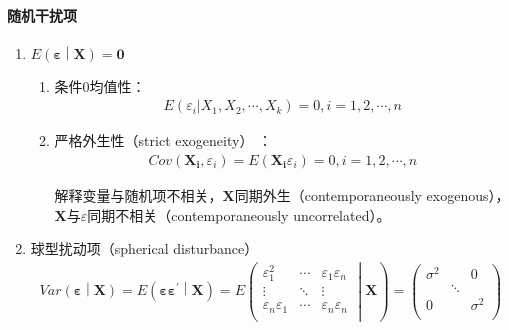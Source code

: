\documentclass[12pt]{book}
\begin{document}
\paragraph{随机干扰项}

\begin{enumerate}[1.]
    \item $E\left(\bm{\varepsilon}\middle|\bm{X}\right)=\bm{0}$
          \begin{enumerate}[(1)]
              \item 条件0均值性：
                    \begin{gather*}
                        E\left(\varepsilon_i|X_1,X_2,\cdots,X_k\right)=0, i=1,2,\cdots,n
                    \end{gather*}
              \item 严格外生性（strict exogeneity） ：
                    \begin{gather*}
                        Cov\left(\mathbf{X_i},\varepsilon_i\right)=E(\mathbf{X_i}\varepsilon_{i})=0, i=1,2,\cdots,n
                    \end{gather*}
                    \par 解释变量与随机项不相关，$\bm{X}$同期外生（contemporaneously exogenous），$\bm{X}$与$\varepsilon$同期不相关（contemporaneously uncorrelated）。
          \end{enumerate}
    \item 球型扰动项（spherical disturbance）
          \begin{gather*}
              Var\left(\bm{\varepsilon}\middle|\bm{X} \right)
              =E\left( \bm{\varepsilon}\bm{\varepsilon}^\prime\middle|\bm{X} 	\right)
              =E\left( \begin{matrix}
                  \varepsilon_1^2            & \cdots & \varepsilon_1\varepsilon_n \\\vdots&\ddots&\vdots\\
                  \varepsilon_n\varepsilon_1 & \cdots & \varepsilon_n\varepsilon_n \\
              \end{matrix} \middle|\bm{X}\right)
              =\left(\begin{matrix}
                      \sigma^2 & \      & 0        \\
                      \        & \ddots & \        \\
                      0        & \      & \sigma^2 \\
                  \end{matrix}\right)

\end{gather*}
\end{enumerate}
\end{document}
